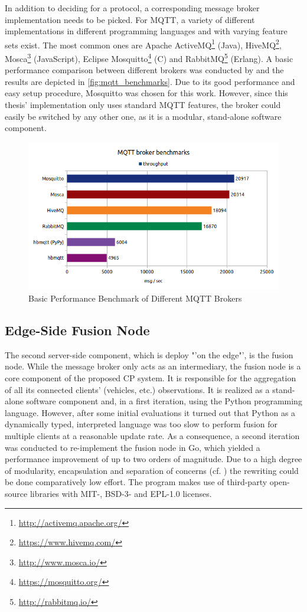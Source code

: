 In addition to deciding for a protocol, a corresponding message broker implementation needs to be picked. For MQTT, a variety of different implementations in different programming languages and with varying feature sets exist. The most common ones are Apache ActiveMQ\footnote{\url{http://activemq.apache.org/}} (Java), HiveMQ\footnote{\url{https://www.hivemq.com/}}, Mosca\footnote{\url{http://www.mosca.io/}} (JavaScript), Eclipse Mosquitto\footnote{\url{https://mosquitto.org/}} (C) and RabbitMQ\footnote{\url{http://rabbitmq.io/}} (Erlang). A basic performance comparison between different brokers was conducted by \cite{Mutsch2019} and the results are depicted in \autoref{fig:mqtt_benchmarks}. Due to its good performance and easy setup procedure, Mosquitto was chosen for this work. However, since this thesis' implementation only uses standard MQTT features, the broker could easily be switched by any other one, as it is a modular, stand-alone software component.

\begin{figure}
	\centering
	\includegraphics[width=0.9\linewidth]{98_images/mqtt_bench_2}
	\caption{Basic Performance Benchmark of Different MQTT Brokers}
	\label{fig:mqtt_benchmarks}
\end{figure}

\subsection{Edge-Side Fusion Node}
\label{subsec:implementation:edge_side_fusion_node}
The second server-side component, which is deploy "'on the edge"', is the fusion node. While the message broker only acts as an intermediary, the fusion node is a core component of the proposed CP system. It is responsible for the aggregation of all its connected clients' (vehicles, etc.) observations. It is realized as a stand-alone software component and, in a first iteration, using the Python programming language. However, after some initial evaluations it turned out that Python as a dynamically typed, interpreted language was too slow to perform fusion for multiple clients at a reasonable update rate. As a consequence, a second iteration was conducted to re-implement the fusion node in Go, which yielded a performance improvement of up to two orders of magnitude. Due to a high degree of modularity, encapsulation and separation of concerns (cf. \cite{Martin2017}) the rewriting could be done comparatively low effort. The program makes use of third-party open-source libraries  with MIT-, BSD-3- and EPL-1.0 licenses.
\par
\bigskip

